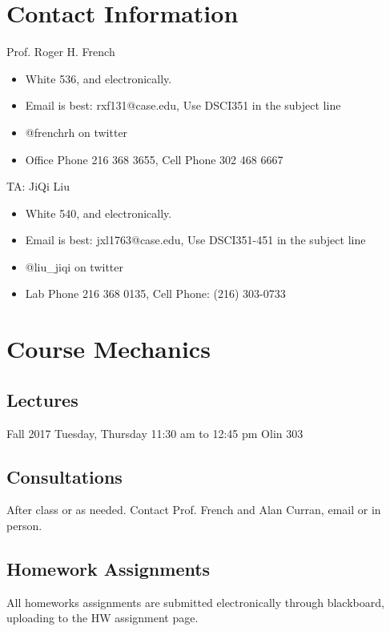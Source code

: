 \documentclass[11pt]{article} %
\begin{document}
\section{Contact Information}

  Prof. Roger H. French
  \begin{itemize}
  	\item White 536, and electronically.
  	\item Email is best: rxf131@case.edu, Use DSCI351 in the subject line
  	\item @frenchrh on twitter
  	\item Office Phone 216 368 3655, Cell Phone 302 468 6667
  \end{itemize}

  TA: JiQi Liu
  \begin{itemize}
  	\item White 540, and electronically.
  	\item Email is best: jxl1763@case.edu, Use DSCI351-451 in the subject line
  	\item @liu\_jiqi on twitter
  	\item Lab Phone 216 368 0135, Cell Phone: (216) 303-0733
  \end{itemize}

\section{Course Mechanics}

  \subsection{Lectures}
  
    Fall 2017 	Tuesday, Thursday 11:30 am to 12:45 pm		Olin 303
  
  \subsection{Consultations}
  
    After class or as needed. Contact Prof. French and Alan Curran, email or in person. 
  
  \subsection{Homework Assignments}
  
    All homeworks assignments are submitted electronically through blackboard, uploading to the HW assignment page. 
  
\end{document}
